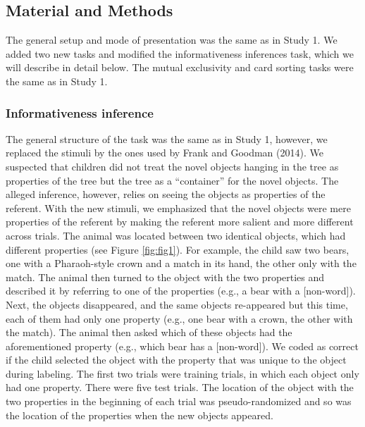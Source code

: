 \documentclass[
  english,
  man,floatsintext]{apa6}
\begin{document}
\hypertarget{material-and-methods-1}{%
\subsection{Material and Methods}\label{material-and-methods-1}}

The general setup and mode of presentation was the same as in Study 1. We added two new tasks and modified the informativeness inferences task, which we will describe in detail below. The mutual exclusivity and card sorting tasks were the same as in Study 1.

\hypertarget{informativeness-inference-1}{%
\subsubsection{Informativeness inference}\label{informativeness-inference-1}}

The general structure of the task was the same as in Study 1, however, we replaced the stimuli by the ones used by Frank and Goodman (2014). We suspected that children did not treat the novel objects hanging in the tree as properties of the tree but the tree as a ``container'' for the novel objects. The alleged inference, however, relies on seeing the objects as properties of the referent. With the new stimuli, we emphasized that the novel objects were mere properties of the referent by making the referent more salient and more different across trials. The animal was located between two identical objects, which had different properties (see Figure \ref{fig:fig1}). For example, the child saw two bears, one with a Pharaoh-style crown and a match in its hand, the other only with the match. The animal then turned to the object with the two properties and described it by referring to one of the properties (e.g., a bear with a {[}non-word{]}). Next, the objects disappeared, and the same objects re-appeared but this time, each of them had only one property (e.g., one bear with a crown, the other with the match). The animal then asked which of these objects had the aforementioned property (e.g., which bear has a {[}non-word{]}). We coded as correct if the child selected the object with the property that was unique to the object during labeling. The first two trials were training trials, in which each object only had one property. There were five test trials. The location of the object with the two properties in the beginning of each trial was pseudo-randomized and so was the location of the properties when the new objects appeared.
\end{document}
